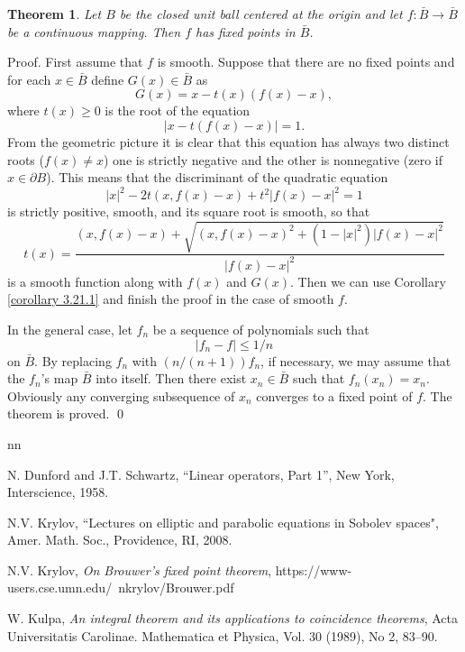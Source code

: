 \documentclass[11pt, reqno]{amsart}
\newtheorem{theorem}{Theorem}%
\theoremstyle{remark}
\theoremstyle{definition}
\begin{document}
 
 
\begin{theorem} 
                                  \label{theorem 3.21.1}
Let $B$ be the closed unit ball
centered at the origin and let $f:\bar{B} \to \bar{B} $ be a 
continuous mapping.
Then
$f$ has fixed points in $\bar{B} $.
\end{theorem}

Proof. First assume that $f$ is smooth.
Suppose that there are no fixed points
 and for each $x\in\bar{B} $
define $G(x)\in \bar{B} $ as 
$$
G(x)=x-t(x)(f(x)-x),
$$
 where
$t(x)\geq0$ is the root of the equation 
$$
|x-t(f(x)-x)|=1.
$$ 
From the geometric picture it is clear
 that this equation has always two distinct roots
($f(x)\ne x$) one is strictly negative and the other
is nonnegative (zero if $x\in\partial B $). This means that 
the discriminant of the quadratic
equation
$$
|x|^{2}-2t(x,f(x)-x)+t^{2}|f(x)-x|^{2}=1
$$
is strictly positive, smooth, and its square root is smooth,
so that
$$
t(x)=\frac{(x,f(x)-x)+\sqrt{(x,f(x)-x)^{2}+(1-|x|^{2})|f(x)-x|^{2}}} 
{|f(x)-x|^{2}}
$$
is a smooth function along with $f(x)$
and $G(x)$.  Then we can use  Corollary
\ref{corollary 3.21.1} and finish the proof in the case
of smooth $f$.

In the general case, let $f_{n}$ be a sequence of polynomials
such that 
$$
|f_{n}- f|\leq 1/n
$$
   on $\bar B$.
By replacing $f_{n}$ with $(n/(n+1))f_{n}$, if necessary,
we may assume that the $f_{n}$'s map $\bar B$ into itself.
Then there exist $x_{n}\in\bar B$ such that $f_{n}(x_{n})
=x_{n}$. Obviously any converging subsequence of $x_{n}$
converges to a fixed point of $f$.
The theorem is proved. \qed



\begin{thebibliography}{nn}

N. Dunford and J.T. Schwartz, ``Linear operators,
Part 1'', New York, Interscience, 1958.

 N.V. Krylov,
``Lectures on elliptic and parabolic equations
in Sobolev spaces", Amer.
Math. Soc., Providence, RI, 2008.

 N.V. Krylov, 
{\em On Brouwer's fixed point theorem\/},
https://www-users.cse.umn.edu/~nkrylov/Brouwer.pdf

 W. Kulpa, {\em An integral theorem and its applications to coincidence theorems\/}, Acta Universitatis Carolinae. Mathematica et Physica, Vol. 30 (1989), No 2, 83--90.
\end{thebibliography}
\end{document}
